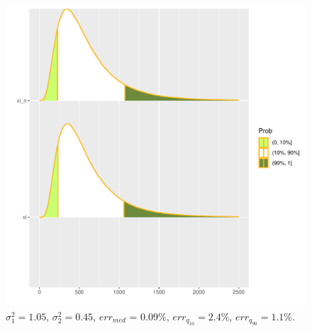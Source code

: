 \documentclass[12pt]{article}
\begin{document}
	\begin{figure}[!hhh]
		\begin{center}
			\begin{minipage}[h]{0.95\linewidth}
				\includegraphics[width=1\linewidth]{img/par_2.pdf}
				\caption{$\sigma_{1}^{2} = 1.05$, $\sigma_{2}^{2} = 0.45$, $err_{med}$ = 0.09\%,  $err_{q_{10}} = 2.4\%$,  $err_{q_{90}} = 1.1\%$. } %
				\label{ris7} %
			\end{minipage}
			
		\end{center}
	\end{figure}
\end{document}
